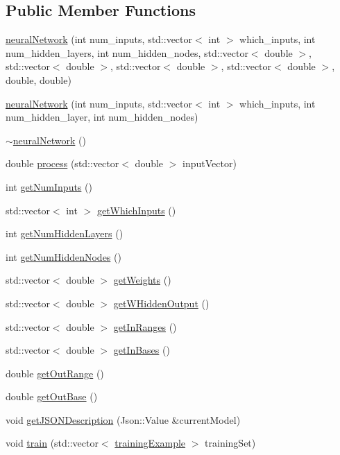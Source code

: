 \subsection*{Public Member Functions}
\begin{DoxyCompactItemize}
\item 
\hyperlink{classneural_network_aee6fd482cd0b6b4004759bb57d4b14db}{neural\+Network} (int num\+\_\+inputs, std\+::vector$<$ int $>$ which\+\_\+inputs, int num\+\_\+hidden\+\_\+layers, int num\+\_\+hidden\+\_\+nodes, std\+::vector$<$ double $>$, std\+::vector$<$ double $>$, std\+::vector$<$ double $>$, std\+::vector$<$ double $>$, double, double)
\item 
\hyperlink{classneural_network_ad5cad1e6ac86745ab47fceeb8d42cbd9}{neural\+Network} (int num\+\_\+inputs, std\+::vector$<$ int $>$ which\+\_\+inputs, int num\+\_\+hidden\+\_\+layer, int num\+\_\+hidden\+\_\+nodes)
\item 
\hyperlink{classneural_network_a0967982cb0345a610f78d225d812086f}{$\sim$neural\+Network} ()
\item 
double \hyperlink{classneural_network_a2da76293dbe590594e79e96768c02a29}{process} (std\+::vector$<$ double $>$ input\+Vector)
\item 
int \hyperlink{classneural_network_aaf9ff8b1a88126fcffc1e9f07a4ffe49}{get\+Num\+Inputs} ()
\item 
std\+::vector$<$ int $>$ \hyperlink{classneural_network_afc93cb28c3897d4d1faa4ac8fbf0c1f8}{get\+Which\+Inputs} ()
\item 
int \hyperlink{classneural_network_ade72f91a9207f52618f9b70cb585a992}{get\+Num\+Hidden\+Layers} ()
\item 
int \hyperlink{classneural_network_a679a628a34f70dd52f781c8c9dbd1a02}{get\+Num\+Hidden\+Nodes} ()
\item 
std\+::vector$<$ double $>$ \hyperlink{classneural_network_a9822cd69469d7b2a946a9f87c8bebe5f}{get\+Weights} ()
\item 
std\+::vector$<$ double $>$ \hyperlink{classneural_network_ac372190f6eabf0af27e5c317f2a1d51b}{get\+W\+Hidden\+Output} ()
\item 
std\+::vector$<$ double $>$ \hyperlink{classneural_network_a876638749a0c7027e82da294947f1840}{get\+In\+Ranges} ()
\item 
std\+::vector$<$ double $>$ \hyperlink{classneural_network_af3fdc1c2bdf4794680ccc4cd845fb47e}{get\+In\+Bases} ()
\item 
double \hyperlink{classneural_network_a9890f2967b4442eda4087869c57bccfd}{get\+Out\+Range} ()
\item 
double \hyperlink{classneural_network_a4524958a9de02bd5e48d0c991d634788}{get\+Out\+Base} ()
\item 
void \hyperlink{classneural_network_a83f5c57ed3f555cd534a6f4ea425dfb7}{get\+J\+S\+O\+N\+Description} (Json\+::\+Value \&current\+Model)
\item 
void \hyperlink{classneural_network_aae35def98392b0d0a51f2c82afc48efc}{train} (std\+::vector$<$ \hyperlink{structtraining_example}{training\+Example} $>$ training\+Set)
\end{DoxyCompactItemize}
